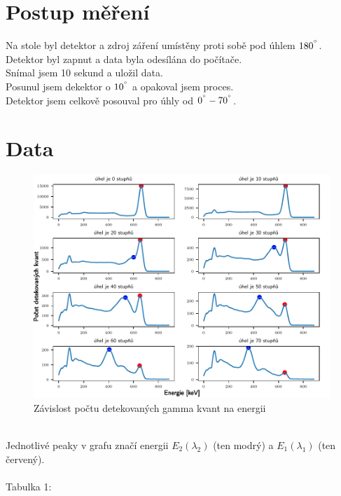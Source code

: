 \documentclass{article}
\begin{document}
\section{Postup měření}
Na stole byl detektor a zdroj záření umístěny proti sobě pod úhlem $180^{\degree}$.\\
Detektor byl zapnut a data byla odesílána do počítače.\\
Snímal jsem 10 sekund a uložil data.\\
Posunul jsem dekektor o $10^{\degree}$ a opakoval jsem proces.\\
Detektor jsem celkově posouval pro úhly od $0^{\degree} - 70^{\degree}$.
\newpage
\section{Data}
\begin{figure}[h]
  \hspace*{-1em}
  \includegraphics[scale=0.8]{figs/fig1.pdf}
  \caption{Závislost počtu detekovaných gamma kvant na energii}
\end{figure}
\\
Jednotlivé peaky v grafu značí energii $E_{2}(\lambda_{2})$ (ten modrý) a $E_{1}(\lambda_{1})$ (ten červený).\\
\\
\footnotesize{Tabulka 1:}\\
\end{document}
